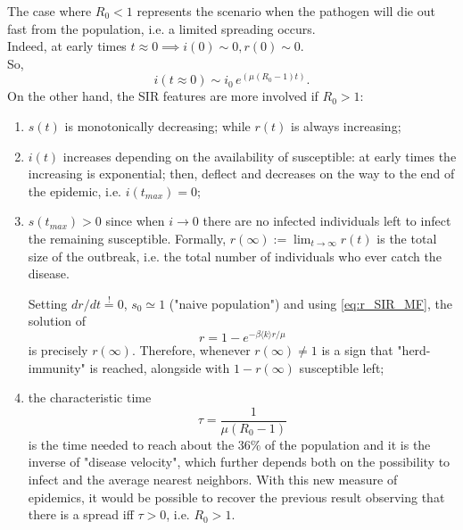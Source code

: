 \documentclass[a4paper,10pt,twoside]{book} %
\theoremstyle{definition}
\begin{document}
The case where $R_0 < 1$ represents the scenario when the pathogen will die out fast from the population, i.e. a limited spreading occurs. 
\\Indeed, at early times $t\approx 0 \implies i(0)\sim 0, r(0)\sim 0$. 
\\So, \cite{barabasi::2016networkbook} \[i(t\approx 0) \sim i_0 \, e^{(\mu(R_0 -1)t)}.\]
On the other hand, the SIR features are more involved if $R_0 > 1$:
\begin{enumerate}
	\item $s(t)$ is monotonically decreasing; while $r(t)$ is always increasing; 
	\item $i(t)$ increases depending on the availability of susceptible: at early times the increasing is exponential; then, deflect and decreases on the way to the end of the epidemic, i.e. $i(t_{max})=0$;
	\item $s(t_{max}) > 0$ since when $i \to 0$ there are no infected individuals left to infect the remaining susceptible. Formally, $r(\infty):=\lim_{t \to \infty} r(t)$ is the total size of the outbreak, i.e. the total number of individuals who ever catch the disease. 
	
	Setting $dr/dt \stackrel{!}{=}0$, $s_0\simeq1$ ("naive population") and using \autoref{eq:r_SIR_MF}, the solution of 
	\begin{equation}
		r = 1 - e^{-\beta \langle k \rangle  r /\mu}
		\label{eq:r_SIR_MF_GiantComp}
	\end{equation}
	is precisely $r(\infty)$. Therefore, whenever $r(\infty)\neq1$ is a sign that "herd-immunity" is reached, alongside with $1-r(\infty)$ susceptible left;
	\item the characteristic time \[ \tau  = \frac{1}{\mu(R_0-1)}\] is the time needed to reach about the $36\%$ of the population and it is the inverse of "disease velocity", which further depends both on the possibility to infect and the average nearest neighbors. With this new measure of epidemics, it would be possible to recover the previous result observing that there is a spread iff $\tau > 0$, i.e. $R_0 > 1$.
\end{enumerate}
\end{document}
